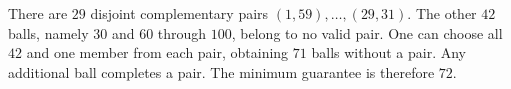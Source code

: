 There are $29$ disjoint complementary pairs $(1,59),\ldots,(29,31)$. The other $42$ balls, namely $30$ and $60$ through $100$, belong to no valid pair. One can choose all $42$ and one member from each pair, obtaining $71$ balls without a pair. Any additional ball completes a pair. The minimum guarantee is therefore $\boxed{72}$.
